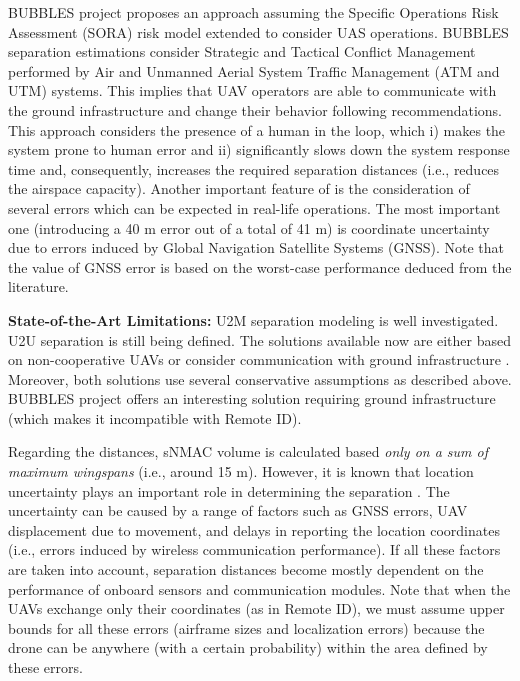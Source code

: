 \documentclass[10pt,conference]{IEEEtran}
\begin{document}
BUBBLES project proposes an approach assuming the Specific Operations Risk Assessment (SORA) risk model \cite{Jarus19} extended to consider UAS operations. 
BUBBLES separation estimations consider Strategic and Tactical Conflict Management \cite{icao_deconf, Vinogradov20} performed by Air and Unmanned Aerial System Traffic Management (ATM and UTM) systems. 
This implies that UAV operators are able to communicate with the ground infrastructure and change their behavior following recommendations. 
This approach considers the presence of a human in the loop, which i) makes the system prone to human error and ii) significantly slows down the system response time and, consequently, increases the required separation distances (i.e., reduces the airspace capacity). 
Another important feature of \cite{Bubbles21} is the consideration of several errors which can be expected in real-life operations. 
The most important one (introducing a 40 m error out of a total of 41 m) is coordinate uncertainty due to errors induced by Global Navigation Satellite Systems (GNSS). 
Note that the value of GNSS error is based on the worst-case performance deduced from the literature.

\textbf{State-of-the-Art Limitations:} U2M separation modeling is well investigated. 
U2U separation is still being defined. 
The solutions available now are either based on non-cooperative UAVs \cite{Weinert22} or consider communication with ground infrastructure \cite{Bubbles21}. 
Moreover, both solutions use several conservative assumptions as described above. 
BUBBLES project offers an interesting solution requiring ground infrastructure (which makes it incompatible with Remote ID). 

Regarding the distances, sNMAC volume \cite{Weinert22} is calculated based \textit{only on a sum of maximum wingspans} (i.e., around 15 m). %
However, it is known that location uncertainty plays an important role in determining the separation \cite{hu2020}. The uncertainty can be caused by a range of factors such as GNSS errors, UAV displacement due to movement, and delays in reporting the location coordinates (i.e., errors induced by wireless communication performance). If all these factors are taken into account, separation distances become mostly dependent on the performance of onboard sensors and communication modules. Note that when the UAVs exchange only their coordinates (as in Remote ID), we must assume upper bounds for all these errors (airframe sizes and localization errors) because the drone can be anywhere (with a certain probability) within the area defined by these errors.
\end{document}
